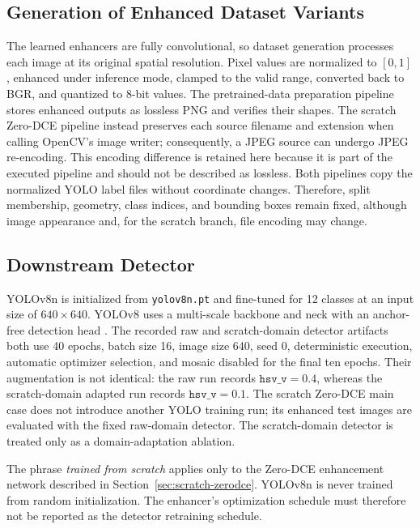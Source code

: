 \documentclass[11pt,a4paper]{article}
\begin{document}
\subsection{Generation of Enhanced Dataset Variants}

The learned enhancers are fully convolutional, so dataset generation processes
each image at its original spatial resolution. Pixel values are normalized to
\([0,1]\), enhanced under inference mode, clamped to the valid range, converted
back to BGR, and quantized to 8-bit values. The pretrained-data preparation
pipeline stores enhanced outputs as lossless PNG and verifies their shapes. The
scratch Zero-DCE pipeline instead preserves each source filename and extension
when calling OpenCV's image writer; consequently, a JPEG source can undergo
JPEG re-encoding. This encoding difference is retained here because it is part
of the executed pipeline and should not be described as lossless. Both pipelines
copy the normalized YOLO label files without coordinate changes. Therefore,
split membership, geometry, class indices, and bounding boxes remain fixed,
although image appearance and, for the scratch branch, file encoding may change.

\subsection{Downstream Detector}

YOLOv8n is initialized from \texttt{yolov8n.pt} and fine-tuned for 12 classes at
an input size of \(640\times640\). YOLOv8 uses a multi-scale backbone and neck
with an anchor-free detection head \cite{ultralytics2023yolov8}. The recorded raw
and scratch-domain detector artifacts both use 40 epochs, batch size 16, image
size 640, seed 0, deterministic execution, automatic optimizer selection, and
mosaic disabled for the final ten epochs. Their augmentation is not identical:
the raw run records \(\texttt{hsv\_v}=0.4\), whereas the scratch-domain adapted
run records \(\texttt{hsv\_v}=0.1\). The scratch Zero-DCE main case does not
introduce another YOLO training run; its enhanced test images are evaluated with
the fixed raw-domain detector. The scratch-domain detector is treated only as a
domain-adaptation ablation.

The phrase \emph{trained from scratch} applies only to the Zero-DCE enhancement
network described in Section~\ref{sec:scratch-zerodce}. YOLOv8n is never trained
from random initialization. The enhancer's optimization schedule must therefore
not be reported as the detector retraining schedule.
\end{document}
